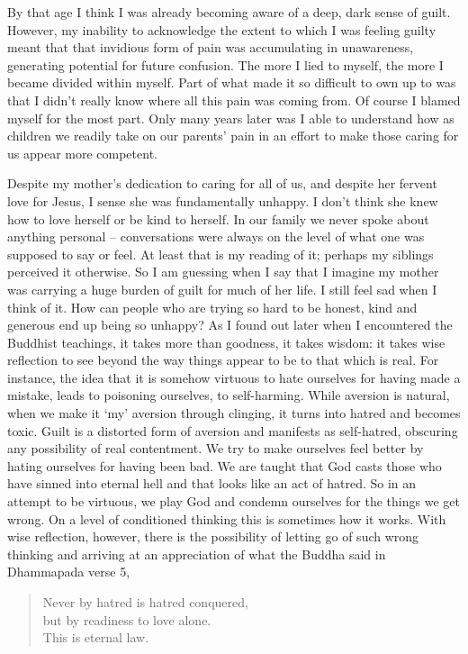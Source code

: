 By that age I think I was already becoming aware of a deep, dark sense
of guilt. However, my inability to acknowledge the extent to which I was
feeling guilty meant that that invidious form of pain was accumulating
in unawareness, generating potential for future confusion. The more I
lied to myself, the more I became divided within myself. Part of what
made it so difficult to own up to was that I didn't really know where
all this pain was coming from. Of course I blamed myself for the most
part. Only many years later was I able to understand how as children we
readily take on our parents' pain in an effort to make those caring for
us appear more competent.

Despite my mother's dedication to caring for all of us, and despite her
fervent love for Jesus, I sense she was fundamentally unhappy. I don't
think she knew how to love herself or be kind to herself. In our family
we never spoke about anything personal -- conversations were always on
the level of what one was supposed to say or feel. At least that is my
reading of it; perhaps my siblings perceived it otherwise. So I am
guessing when I say that I imagine my mother was carrying a huge burden
of guilt for much of her life. I still feel sad when I think of it. How
can people who are trying so hard to be honest, kind and generous end up
being so unhappy? As I found out later when I encountered the Buddhist
teachings, it takes more than goodness, it takes wisdom: it takes wise
reflection to see beyond the way things appear to be to that which is
real. For instance, the idea that it is somehow virtuous to hate
ourselves for having made a mistake, leads to poisoning ourselves, to
self-harming. While aversion is natural, when we make it `my' aversion
through clinging, it turns into hatred and becomes toxic. Guilt is a
distorted form of aversion and manifests as self-hatred, obscuring any
possibility of real contentment. We try to make ourselves feel better by
hating ourselves for having been bad. We are taught that God casts those
who have sinned into eternal hell and that looks like an act of hatred.
So in an attempt to be virtuous, we play God and condemn ourselves for
the things we get wrong. On a level of conditioned thinking this is
sometimes how it works. With wise reflection, however, there is the
possibility of letting go of such wrong thinking and arriving at an
appreciation of what the Buddha said in Dhammapada verse 5\cite{dhammapada},

\begin{quote}
  Never by hatred is hatred conquered,\\
  but by readiness to love alone.\\
  This is eternal law.
\end{quote}

